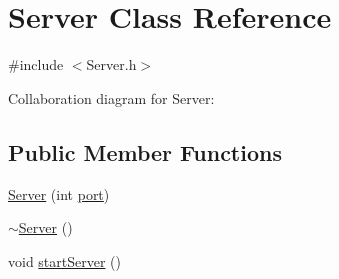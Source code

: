 \hypertarget{classServer}{}\section{Server Class Reference}
\label{classServer}


{\ttfamily \#include $<$Server.\+h$>$}



Collaboration diagram for Server\+:
\subsection*{Public Member Functions}
\begin{DoxyCompactItemize}
\item 
\mbox{\hyperlink{classServer_a7d1fe6ba5f0fe9190a4f039662ea0e85}{Server}} (int \mbox{\hyperlink{classServer_a926c9dae229a62b6d33fdbb41dca6d82}{port}})
\item 
\mbox{\hyperlink{classServer_a4b3aa2579cb1c8cd1d069582c14d0fa6}{$\sim$\+Server}} ()
\item 
void \mbox{\hyperlink{classServer_af59bb3a96b3311ed2b87e2d6899d9f79}{start\+Server}} ()
\end{DoxyCompactItemize}
